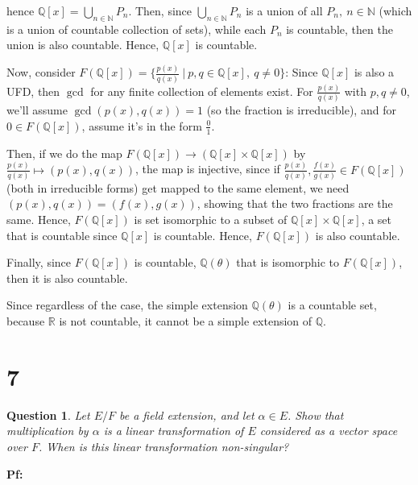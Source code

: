 \documentclass{article}
\newtheorem{question}{Question}
\begin{document}
\begin{itemize}
    hence $\mathbb{Q}[x]=\bigcup_{n\in\mathbb{N}}P_n$. Then, since $\bigcup_{n\in\mathbb{N}}P_n$ is a union of all $P_n,\ n\in\mathbb{N}$ (which is a union of countable collection of sets), while each $P_n$ is countable,
    then the union is also countable. Hence, $\mathbb{Q}[x]$ is countable.

    Now, consider $F(\mathbb{Q}[x])=\{\frac{p(x)}{q(x)}\ |\ p,q\in\mathbb{Q}[x],\ q\neq 0\}$: Since $\mathbb{Q}[x]$ is also a UFD, then $\gcd$ for any finite collection of elements exist. For $\frac{p(x)}{q(x)}$ with $p,q\neq 0$, we'll assume $\gcd(p(x),q(x))=1$ (so the fraction is irreducible),
    and for $0\in F(\mathbb{Q}[x])$, assume it's in the form $\frac{0}{1}$.

    Then, if we do the map $F(\mathbb{Q}[x])\rightarrow (\mathbb{Q}[x]\times \mathbb{Q}[x])$ by $\frac{p(x)}{q(x)}\mapsto (p(x),q(x))$, the map is injective, since if $\frac{p(x)}{q(x)},\frac{f(x)}{g(x)}\in F(\mathbb{Q}[x])$ (both in irreducible forms) get mapped to the same element, we need $(p(x),q(x))=(f(x),g(x))$,
    showing that the two fractions are the same. Hence, $F(\mathbb{Q}[x])$ is set isomorphic to a subset of $\mathbb{Q}[x]\times \mathbb{Q}[x]$, a set that is countable since $\mathbb{Q}[x]$ is countable. Hence, $F(\mathbb{Q}[x])$ is also countable.

    Finally, since $F(\mathbb{Q}[x])$ is countable, $\mathbb{Q}(\theta)$ that is isomorphic to $F(\mathbb{Q}[x])$, then it is also countable.
\end{itemize}

Since regardless of the case, the simple extension $\mathbb{Q}(\theta)$ is a countable set, because $\mathbb{R}$ is not countable, it cannot be a simple extension of $\mathbb{Q}$.

\break

\section*{7}
\begin{myBox}[]{}
    \begin{question}
        Let $E/F$ be a field extension, and let $\alpha\in E$. Show that multiplication by $\alpha$ is a
        linear transformation of $E$ considered as a vector space over $F$. When is this linear
        transformation non-singular?
    \end{question}
\end{myBox}

\textbf{Pf:}
\end{document}
